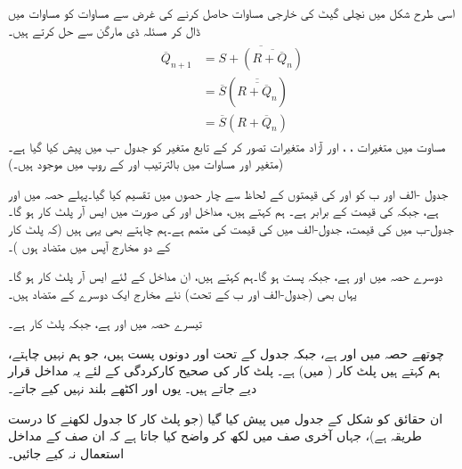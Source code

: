 اسی طرح شکل   میں  نچلی  گیٹ کی خارجی مساوات حاصل کرنے کی غرض سے  مساوات   کو مساوات      میں ڈال کر مسئلہ ڈی مارگن  سے حل کرتے  ہیں۔
\begin{gather}
\begin{aligned}\label{مساوات_ترتیبی_ایس_آر_متمم}
\overline{Q}_{n+1}&=\overline{S+(\overline{R+\overline{Q}_n})}\\
&=\overline{S}(\overline{\overline{R+\overline{Q}_n}})\\
&=\overline{S}(R+\overline{Q}_n)
\end{aligned}
\end{gather}
مساوت    میں  متغیرات  ، ، اور   آزاد متغیرات تصور کر کے تابع متغیر  کو  جدول   -ب  میں پیش کیا  گیا ہے۔(متغیر  اور   مساوات میں     بالترتیب  اور   کے روپ میں موجود ہیں۔)



 جدول  -الف اور ب   کو   اور   کی قیمتوں کے لحاظ سے چار حصوں میں تقسیم کیا گیا۔پہلے حصہ میں   اور  ہے، جبکہ  کی قیمت   کے برابر ہے۔ ہم کہتے ہیں،  مداخل  اور  کی صورت میں  ایس آر  پلٹ کار    ہو گا۔ جدول-ب
  میں  کی قیمت، جدول-الف  میں کی قیمت  کی متمم ہے۔ہم چاہتے بھی یہی ہیں (کہ پلٹ کار کے دو مخارج آپس میں متضاد ہوں )۔
 
دوسرے حصہ میں   اور    ہے، جبکہ  پست ہو گا۔ہم کہتے ہیں، ان مداخل کے لئے  ایس آر پلٹ کار    ہو گا۔یہاں بھی (جدول-الف  اور ب  کے تحت)   نئے مخارج ایک دوسرے کے متضاد ہیں۔

تیسرے حصہ  میں  اور  ہے، جبکہ پلٹ کار    ہے۔

چوتھے حصہ میں  اور  ہے، جبکہ  جدول کے تحت   اور  دونوں پست ہیں، جو ہم نہیں چاہتے، ہم کہتے ہیں پلٹ کار  (  میں)  ہے۔  پلٹ کار کی صحیح کارکردگی کے لئے یہ مداخل    قرار دیے جاتے ہیں۔ یوں  اور      اکٹھے بلند نہیں کیے جاتے۔

ان حقائق کو شکل  کے     جدول میں  پیش کیا گیا   (جو  پلٹ کار کا جدول لکھنے کا درست طریقہ ہے)، جہاں آخری صف میں    لکھ کر واضح کیا جاتا ہے کہ ان صف کے مداخل استعمال نہ کیے جائیں۔ 

